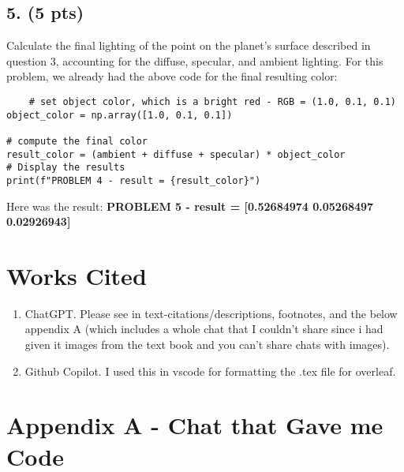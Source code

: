 \documentclass{article}
\begin{document}
\subsection*{5. (5 pts)}
Calculate the final lighting of the point on the planet’s surface described in question 3, accounting for the diffuse, specular, and ambient lighting.
For this problem, we already had the above code for the final resulting color: 
\begin{verbatim}
    # set object color, which is a bright red - RGB = (1.0, 0.1, 0.1)
object_color = np.array([1.0, 0.1, 0.1])

# compute the final color
result_color = (ambient + diffuse + specular) * object_color
# Display the results
print(f"PROBLEM 4 - result = {result_color}")
\end{verbatim}
Here was the result: \textbf{PROBLEM 5 - result = [0.52684974 0.05268497 0.02926943]}
\section{Works Cited}
\begin{enumerate}
    \item ChatGPT. Please see in text-citations/descriptions, footnotes, and the below appendix A (which includes a whole chat that I couldn't share since i had given it images from the text book and you can't share chats with images).
    \item Github Copilot. I used this in vscode for formatting the .tex file for overleaf.
\end{enumerate}
\newpage
\appendix
\section{Appendix A - Chat that Gave me Code}

\end{document}
